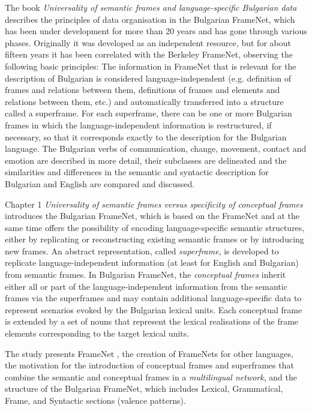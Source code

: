 \begin{refsection}

The book \textit{Universality of semantic frames and language-specific Bulgarian data} describes the principles of data organisation in the Bulgarian FrameNet, which has been under development for more than 20 years and has gone through various phases. Originally it was developed as an independent resource, but for about fifteen years it has been correlated with the Berkeley FrameNet, observing the following basic principles: The information in FrameNet that is relevant for the description of Bulgarian is considered language-independent (e.g. definition of frames and relations between them, definitions of frames and elements and relations between them, etc.) and automatically transferred into a structure called a superframe. For each superframe, there can be one or more Bulgarian frames in which the language-independent information is restructured, if necessary, so that it corresponds exactly to the description for the Bulgarian language. The Bulgarian verbs of communication, change, movement, contact and emotion are described in more detail, their subclasses are delineated and the similarities and differences in the semantic and syntactic description for Bulgarian and English are compared and discussed. 

Chapter 1 \textit{Universality of semantic frames versus specificity of conceptual frames} introduces the Bulgarian FrameNet, which is based on the FrameNet and at the same time offers the possibility of encoding language-specific semantic structures, either by replicating or reconstructing existing semantic frames or by introducing new frames. An abstract representation, called \emph{superframe}, is developed to replicate language-independent information (at least for English and Bulgarian) from semantic frames. In Bulgarian FrameNet, the \emph{conceptual frames} inherit either all or part of the language-independent information from the semantic frames via the superframes and may contain additional language-specific data to represent scenarios evoked by the Bulgarian lexical units. Each conceptual frame is extended by a set of nouns that represent the lexical realisations of the frame elements corresponding to the target lexical units.

The study presents FrameNet \citep{Fillmore2003,fillmore2010}, the creation of FrameNets for other languages, the motivation for the introduction of conceptual frames and superframes that combine the semantic and conceptual frames in a \emph{multilingual network}, and the structure of the Bulgarian FrameNet, which includes Lexical, Grammatical, Frame, and Syntactic sections (valence patterns).


\end{refsection}
